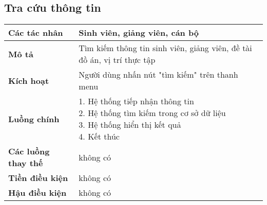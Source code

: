 \subsection*{Tra cứu thông tin}
	\begin{tabular}{|l|p{}|}
		\hline
		\textbf{Các tác nhân}         & Sinh viên, giảng viên, cán bộ                     \\
		\hline
		\textbf{Mô tả}                & Tìm kiếm thông tin sinh viên, giảng viên, đề tài đồ án, vị trí thực tập \\
		\hline
		\textbf{Kích hoạt}            & Người dùng nhấn nút "tìm kiếm" trên thanh menu                          \\
		\hline
		\textbf{Luồng chính}           & \makecell[l]{1. Hệ thống tiếp nhận thông tin                            \\ 2. Hệ thống tìm kiếm trong cơ sở dữ liệu \\ 3. Hệ thống hiển thị kết quả \\ 4. Kết thúc} \\
		\hline
		\textbf{Các luồng thay thế}   & không có                                                                \\
		\hline
		\textbf{Tiền điều kiện}       & không có                                                                \\
		\hline
		\textbf{Hậu điều kiện}        & không có                                                                \\
		\hline
	\end{tabular}

